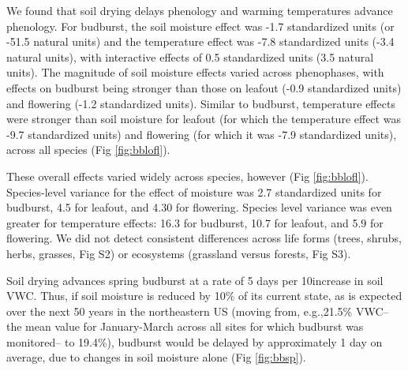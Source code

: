 \documentclass{article}
\begin{document}
\par We found that soil drying delays phenology and warming temperatures advance phenology. For budburst, the soil moisture effect was -1.7 standardized units (or -51.5 natural units) and the temperature effect was -7.8 standardized units (-3.4 natural units), with interactive effects of 0.5 standardized units (3.5 natural units). The magnitude of soil moisture effects varied across phenophases, with effects on budburst being stronger than those on leafout (-0.9 standardized units) and flowering (-1.2 standardized units). Similar to budburst, temperature effects were stronger than soil moisture for leafout (for which the temperature effect was -9.7 standardized units) and flowering (for which it was -7.9 standardized units), across all species (Fig \ref{fig:bblofl}). %
\par These overall effects varied widely across species, however (Fig \ref{fig:bblofl}). Species-level variance for the effect of moisture was 2.7 standardized units for budburst, 4.5 for leafout, and 4.30 for flowering. Species level variance was even greater for temperature effects: 16.3 for budburst, 10.7 for leafout, and 5.9 for flowering.
We did not detect consistent differences across life forms (trees, shrubs, herbs, grasses, Fig S2) or ecosystems (grassland versus forests, Fig S3).

\par Soil drying advances spring budburst at a rate of 5 days per 10\percent increase in soil VWC. Thus, if soil moisture is reduced by 10\% of its current state, as is expected over the next 50 years in the northeastern US \citep{berg2017} (moving from, e.g.,21.5\% VWC-- the mean value for January-March across all sites for which budburst was monitored-- to 19.4\%), budburst would be delayed by approximately 1 day on average, due to changes in soil moisture alone (Fig \ref{fig:bbsp}).

\end{document}
